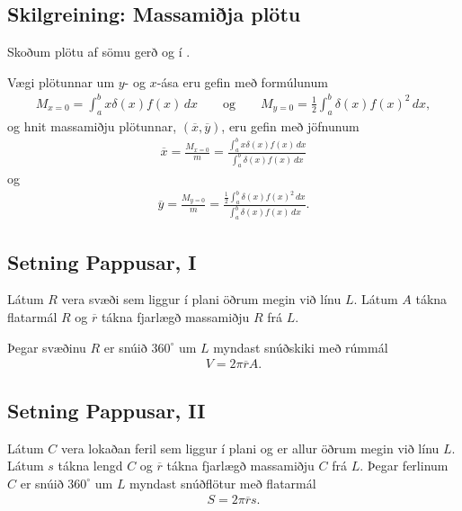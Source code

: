 \documentclass[a4paper,10pt,icelandic]{sphinxmanual}
\begin{document}
\subsection{Skilgreining: Massamiðja plötu}
\label{kafli07:index-14}\label{kafli07:skilgreining-massamija-plotu}
Skoðum plötu af sömu gerð og í {\hyperref[kafli07:massi\string-plotu]{}}.

Vægi plötunnar um \(y\)- og \(x\)-ása eru gefin með formúlunum
\begin{equation*}
\begin{split}M_{x=0}=\int_a^b x\delta(x)f(x)\,dx
\qquad\mbox{og}\qquad
M_{y=0}=\frac{1}{2}\int_a^b \delta(x)f(x)^2\,dx,\end{split}
\end{equation*}
og hnit massamiðju plötunnar, \((\overline{x}, \overline{y})\), eru
gefin með jöfnunum
\begin{equation*}
\begin{split}\overline{x}=\frac{M_{x=0}}{m}=
\frac{\int_a^b x\delta(x)f(x)\,dx}{\int_a^b \delta(x)f(x)\,dx}\end{split}
\end{equation*}
og
\begin{equation*}
\begin{split}\overline{y}=\frac{M_{y=0}}{m}=
\frac{\frac{1}{2}\int_a^b \delta(x)f(x)^2\,dx}{\int_a^b
\delta(x)f(x)\,dx}.\end{split}
\end{equation*}

\subsection{Setning Pappusar, I}
\label{kafli07:setning-pappusar-i}\label{kafli07:index-15}
Látum \(R\) vera svæði sem liggur í plani öðrum megin við línu
\(L\). Látum \(A\) tákna flatarmál \(R\) og
\(\overline{r}\) tákna fjarlægð massamiðju \(R\) frá \(L\).

Þegar svæðinu \(R\) er snúið \(360^\circ\) um \(L\) myndast
snúðskiki með rúmmál
\begin{equation*}
\begin{split}V=2\pi\overline{r}A.\end{split}
\end{equation*}

\subsection{Setning Pappusar, II}
\label{kafli07:setning-pappusar-ii}
Látum \(C\) vera lokaðan feril sem liggur í plani og er allur öðrum
megin við línu \(L\). Látum \(s\) tákna lengd \(C\) og
\(\overline{r}\) tákna fjarlægð massamiðju \(C\) frá \(L\).
Þegar ferlinum \(C\) er snúið \(360^\circ\) um \(L\) myndast
snúðflötur með flatarmál
\begin{equation*}
\begin{split}S=2\pi\overline{r}s.\end{split}
\end{equation*}
\end{document}
